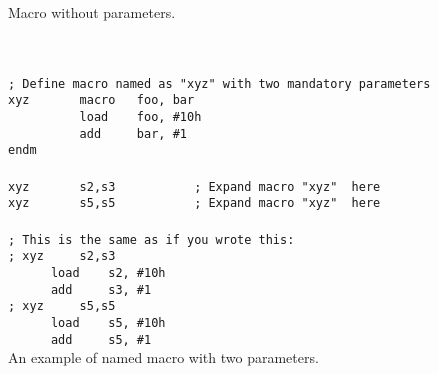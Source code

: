            Macro without parameters.
           
        {
            ~\\
            \usecodefont\\
            \verb'; Define macro named as "xyz" with two mandatory parameters'\\
            \verb'xyz       macro   foo, bar'\\
            \verb'          load    foo, #10h'\\
            \verb'          add     bar, #1'\\
            \verb'endm'\\\\
            \verb'xyz       s2,s3           ; Expand macro "xyz"  here'\\
            \verb'xyz       s5,s5           ; Expand macro "xyz"  here'\\\\
            \verb'; This is the same as if you wrote this:'\\
            \verb'; xyz     s2,s3'\\
            \verb'      load    s2, #10h'\\
            \verb'      add     s3, #1'\\
            \verb'; xyz     s5,s5'\\
            \verb'      load    s5, #10h'\\
            \verb'      add     s5, #1'\\
        }
        An example of named macro with two parameters.

